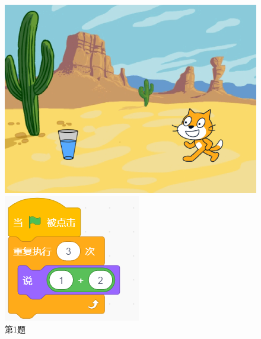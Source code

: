 \documentclass[10pt, a4paper]{article}
\begin{document}
\begin{enumerate}
        \begin{figure}[htbp]
            \centering
            \begin{minipage}[t]{.18\textwidth}
                \centering
                \includegraphics[width=\textwidth]{1.png}
                \caption*{第1题}
            \end{minipage}
            \begin{minipage}[t]{.15\textwidth}
                \centering
                \includegraphics[width=\textwidth]{2.png}

\end{minipage}
\end{figure}
\end{enumerate}
\end{document}
